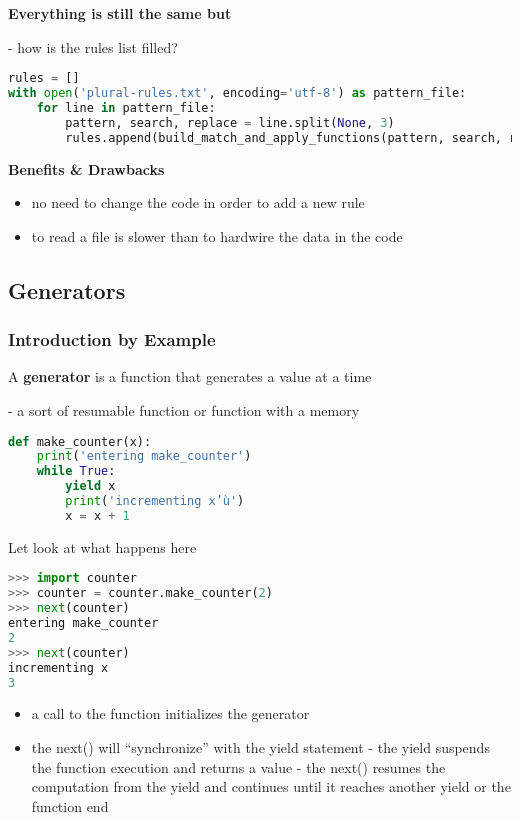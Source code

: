 \textbf{Everything is still the same but}

- how is the rules list filled?

\begin{lstlisting}[language=Python]
rules = []
with open('plural-rules.txt', encoding='utf-8') as pattern_file:
	for line in pattern_file:
		pattern, search, replace = line.split(None, 3)
		rules.append(build_match_and_apply_functions(pattern, search, replace))
\end{lstlisting}

\textbf{Benefits \& Drawbacks}

\begin{itemize}
	\item no need to change the code in order to add a new rule
	\item to read a file is slower than to hardwire the data in the code
\end{itemize}

\subsection{Generators}

\subsubsection{Introduction by Example}
 A \textbf{generator} is a function that generates a value at a time
 
 - a sort of resumable function or function with a memory
 
\begin{lstlisting}[language=Python]
def make_counter(x):
	print('entering make_counter')
	while True:
		yield x
		print('incrementing x’ù')
		x = x + 1
\end{lstlisting}

Let look at what happens here
\begin{lstlisting}[language=Python]
>>> import counter
>>> counter = counter.make_counter(2)
>>> next(counter)
entering make_counter
2
>>> next(counter)
incrementing x
3
\end{lstlisting}

\begin{itemize}
	\item a call to the function initializes the generator
	\item the next() will “synchronize” with the yield statement
	- the yield suspends the function execution and returns a value
	- the next() resumes the computation from the yield and continues until it reaches another yield or the function end
\end{itemize}


